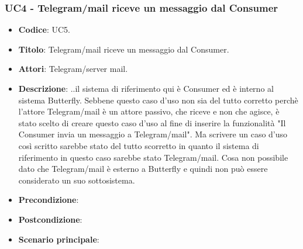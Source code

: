 \subsubsection{UC4 - Telegram/mail riceve un messaggio dal Consumer} 
	\begin{itemize}
		\item \textbf{Codice}: UC5.
		\item \textbf{Titolo}: Telegram/mail riceve un messaggio dal Consumer.
		\item \textbf{Attori}: Telegram/server mail.
		\item \textbf{Descrizione}: ..il sistema di riferimento qui è Consumer ed è interno al sistema Butterfly.
		Sebbene questo caso d'uso non sia del tutto corretto perchè l'attore Telegram/mail è un attore passivo, che riceve e non che agisce, è stato scelto di creare questo caso d'uso al fine di inserire la funzionalità "Il Consumer invia un messaggio a Telegram/mail". Ma scrivere un caso d'uso così scritto sarebbe stato del tutto scorretto in quanto il sistema di riferimento in questo caso sarebbe stato Telegram/mail. Cosa non possibile dato che Telegram/mail è esterno a Butterfly e quindi non può essere considerato un suo sottosistema.
		\item \textbf{Precondizione}:
		\item \textbf{Postcondizione}:
		\item \textbf{Scenario principale}: 
	\end{itemize}



